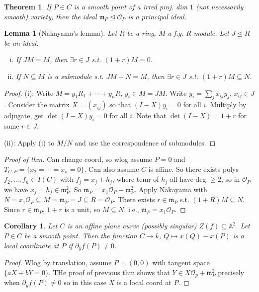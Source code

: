 \documentclass{article}
\theoremstyle{definition}
\theoremstyle{remark}
\theoremstyle{plain}
\newtheorem{lem}[defn]{Lemma}
\newtheorem{thm}[defn]{Theorem}
\newtheorem{crly}[defn]{Corollary}
\newcommand{\bA}{\mathbb{A}}
\begin{document}
\begin{thm}
    If $P\in C$ is a smooth point of a irred proj. dim $1$ (not necessarily smooth) variety, then the ideal $\mathfrak m_P\trianglelefteq \mathcal O_P$ is a principal ideal.
\end{thm}
\begin{lem}[Nakayama's lemma]
    Let $R$ be a ring, $M$ a f.g. $R$-module. Let $J\trianglelefteq R$ be an ideal. \begin{enumerate}[(i)]
        \item If $JM=M$, then $\exists r\in J$ s.t. $(1+r)M=0$.
        \item If $N\subseteq M$ is a submodule s.t. $JM+N=M$, then $\exists r\in J$ s.t. $(1+r)M\subseteq N$.
    \end{enumerate}
\end{lem}
\begin{proof}
    (i): Write $M=y_1R_1+\cdots+y_nR$, $y_i\in M=JM$. Write $y_i=\sum_jx_{ij}y_j$, $x_{ij}\in J$. Consider the matrix $X=(x_{ij})$ so that $(I-X)y_i=0$ for all $i$. Multiply by adjugate, get $\det(I-X)y_i=0$ for all $i$. Note that $\det(I-X)=1+r$ for some $r\in J$.

    (ii): Apply (i) to $M/N$ and use the correspondence of submodules.
\end{proof}
\begin{proof}[Proof of thm]
    Can change coord, so wlog assume $P=0$ and $T_{C,P}=\{x_2=\cdots=x_n=0\}$. Can also assume $C$ is affine. So there exists polys $f_2,...,f_n\in I(C)$ with $f_j=x_j+h_j$, where temr of $h_j$ all have deg $\ge 2$, so in $\mathcal O_P$ we have $x_j=h_j\in\mathfrak m_P^2$. So $\mathfrak m_P=x_1\mathcal O_P+\mathfrak m_P^2$. Apply Nakayama with $N=x_1\mathcal O_P\subseteq M=\mathfrak m_P=J\subseteq R=\mathcal O_P$. There exists $r\in\mathfrak m_P$ s.t. $(1+R)M\subseteq N$. Since $r\in\mathfrak m_P$, $1+r$ is a unit, so $M\subseteq N$, i.e., $\mathfrak m_P=x_1\mathcal O_P$.
\end{proof}
\begin{crly}
    Let $C$ is an affine plane curve (possibly singular) $Z(f)\subseteq\bA^2$. Let $P\in C$ be a smooth point. Then the function $C\to k$, $Q\mapsto x(Q)-x(P)$ is a local coordinate at $P$ if $\partial_yf(P)\neq0$.
\end{crly}
\begin{proof}
    Wlog by translation, assume $P=(0,0)$ with tangent space $\{aX+bY=0\}$. THe proof of previous thm shows that $Y\in X\mathcal O_p+\mathfrak m_P^2$ precisely when $\partial_yf(P)\neq0$ so in this case $X$ is a local coord at $P$.
\end{proof}
\end{document}
